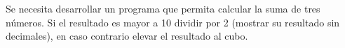 Se necesita desarrollar un programa que permita calcular la suma de tres números. Si el resultado es mayor a 10 dividir por 2 (mostrar su resultado sin decimales), en caso contrario elevar el resultado al cubo.